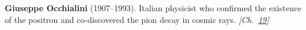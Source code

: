 \textbf{Giuseppe Occhialini} (1907–1993). Italian physicist who confirmed the existence of the positron and co-discovered the pion decay in cosmic rays. \emph{[Ch.~\hyperref[ch:cosmicraymuons]{19}]}

